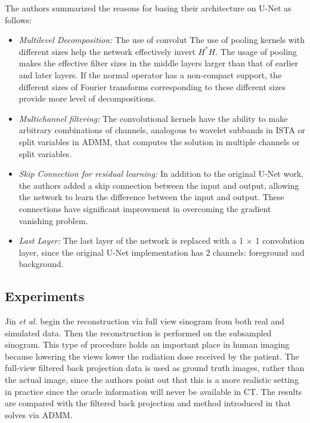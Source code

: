 \documentclass[journal, onecolumn, 11pt]{IEEEtran}
\begin{document}
The authors summarized the reasons for basing their architecture on U-Net as follows: 
\begin{itemize}
    \item \textit{Multilevel Decomposition:} The use of convolut The use of pooling kernels with different sizes help the network effectively invert $H^\ast H$. The usage of pooling makes the effective filter sizes in the middle layers larger than that of earlier and later layers. If the normal operator has a non-compact support, the different sizes of Fourier transforms corresponding to these different sizes provide more level of decompositions.
    \item \textit{Multichannel filtering:} The convolutional kernels have the ability to make arbitrary combinations of channels, analogous to wavelet subbands in ISTA or split variables in ADMM, that computes the solution in multiple channels or split variables. 
    \item \textit{Skip Connection for residual learning:} In addition to the original U-Net work, the authors added a skip connection between the input and output, allowing the network to learn the difference between the input and output. These connections have significant improvement in overcoming the gradient vanishing problem. 
    \item \textit{Last Layer:} The last layer of the network is replaced with a 1 $\times$ 1 convolution layer, since the original U-Net implementation has 2 channels: foreground and background. 
\end{itemize}

\subsection{Experiments}

Jin \textit{et al.} begin the reconstruction via full view sinogram from both real and simulated data. Then the reconstruction is performed on the subsampled sinogram. This type of procedure holds an important place in human imaging because lowering the views lower the radiation dose received by the patient. The full-view filtered back projection data is used as ground truth images, rather than the actual image, since the authors point out that this is a more realistic setting in practice since the oracle information will never be available in CT. The results are compared with the filtered back projection and method introduced in \cite{mccann2016fast} that solves  via ADMM. 
\end{document}
